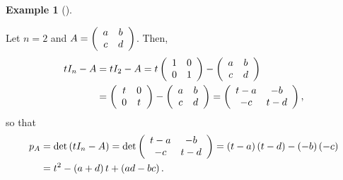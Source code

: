 \documentclass[numbers=enddot,12pt,final,onecolumn,notitlepage]{scrartcl}%
\numberwithin{exer}{subsection}
\theoremstyle{definition}
\newtheorem{exam}[theo]{Example}
\newenvironment{example}[1][]
{\begin{exam}[#1]\begin{leftbar}}
{\end{leftbar}\end{exam}}
\begin{document}
\begin{example}
\label{exa.schurtri.ch.pA.2x2}Let $n=2$ and $A=\left(
\begin{array}
[c]{cc}%
a & b\\
c & d
\end{array}
\right)  $. Then,%
\begin{align*}
tI_{n}-A  &  =tI_{2}-A=t\left(
\begin{array}
[c]{cc}%
1 & 0\\
0 & 1
\end{array}
\right)  -\left(
\begin{array}
[c]{cc}%
a & b\\
c & d
\end{array}
\right) \\
&  =\left(
\begin{array}
[c]{cc}%
t & 0\\
0 & t
\end{array}
\right)  -\left(
\begin{array}
[c]{cc}%
a & b\\
c & d
\end{array}
\right)  =\left(
\begin{array}
[c]{cc}%
t-a & -b\\
-c & t-d
\end{array}
\right)  ,
\end{align*}
so that%
\begin{align*}
p_{A}  &  =\det\left(  tI_{n}-A\right)  =\det\left(
\begin{array}
[c]{cc}%
t-a & -b\\
-c & t-d
\end{array}
\right)  =\left(  t-a\right)  \left(  t-d\right)  -\left(  -b\right)  \left(
-c\right) \\
&  =t^{2}-\left(  a+d\right)  t+\left(  ad-bc\right)  .
\end{align*}

\end{example}
\end{document}
